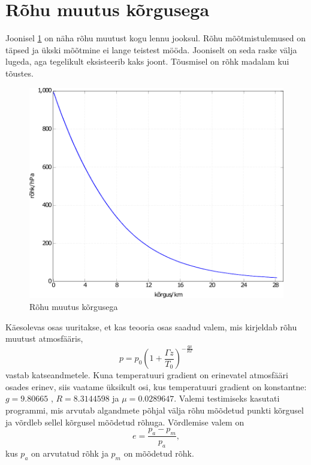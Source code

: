 \documentclass{trkut}%
\begin{document}
\section{Rõhu muutus kõrgusega}
Joonisel \ref{prekõrg} on näha rõhu muutust kogu lennu jooksul. Rõhu mõõtmistulemused on täpsed ja ükski mõõtmine ei lange teistest mööda. Jooniselt on seda raske välja lugeda, aga tegelikult eksisteerib kaks joont. Tõusmisel on rõhk madalam kui tõustes.
\begin{figure}[h]
	\includegraphics[width=1\textwidth]{PicGra/prekõrg.pdf}
	\caption{Rõhu muutus kõrgusega}
	\label{prekõrg}%
\end{figure}

Käesolevas osas uuritakse, et kas teooria osas saadud valem, mis kirjeldab rõhu muutust atmosfääris,
\begin{equation*}
p = p_0 \left(1+\frac{\Gamma z}{T_0}\right)^{-\frac{g\mu}{R\Gamma}}
\end{equation*}
vastab katseandmetele. Kuna temperatuuri gradient on erinevatel atmosfääri osades erinev, siis vaatame üksikult osi, kus temperatuuri gradient on konstantne: $g = 9.80665 $ , $R = 8.3144598$ ja $\mu = 0.0289647$. Valemi testimiseks kasutati programmi, mis arvutab algandmete põhjal välja rõhu mõõdetud punkti kõrgusel ja võrdleb sellel kõrgusel mõõdetud rõhuga. Võrdlemise valem on
\begin{equation*}
e = \frac{p_a-p_m}{p_a},
\end{equation*}
kus $p_a$ on arvutatud rõhk ja $p_m$ on mõõdetud rõhk.
\end{document}
